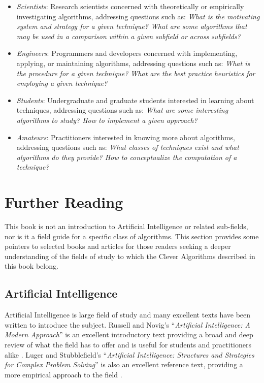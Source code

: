 \begin{bibunit}
\begin{itemize}
	\item \emph{Scientists}: Research scientists concerned with theoretically or empirically investigating algorithms, addressing questions such as: \emph{What is the motivating system and strategy for a given technique? What are some algorithms that may be used in a comparison within a given subfield or across subfields?}
	\item \emph{Engineers}: Programmers and developers concerned with implementing, applying, or maintaining algorithms, addressing questions such as: \emph{What is the procedure for a given technique? What are the best practice heuristics for employing a given technique?}
	\item \emph{Students}: Undergraduate and graduate students interested in learning about techniques, addressing questions such as: \emph{What are some interesting algorithms to study? How to implement a given approach?}
	\item \emph{Amateurs}: Practitioners interested in knowing more about algorithms, addressing questions such as: \emph{What classes of techniques exist and what algorithms do they provide? How to conceptualize the computation of a technique?}
\end{itemize}

% 
% 
\section{Further Reading}
\label{intro:sec:further_reading}
This book is not an introduction to Artificial Intelligence or related sub-fields, nor is it a field guide for a specific class of algorithms. This section provides some pointers to selected books and articles for those readers seeking a deeper understanding of the fields of study to which the Clever Algorithms described in this book belong.

% 
% 
\subsection{Artificial Intelligence}
Artificial Intelligence is large field of study and many excellent texts have been written to introduce the subject. Russell and Novig's ``\emph{Artificial Intelligence: A Modern Approach}'' is an excellent introductory text providing a broad and deep review of what the field has to offer and is useful for students and practitioners alike \cite{Russell2009}. Luger and Stubblefield's ``\emph{Artificial Intelligence: Structures and Strategies for Complex Problem Solving}'' is also an excellent reference text, providing a more empirical approach to the field \cite{Luger1993}.


\end{bibunit}
